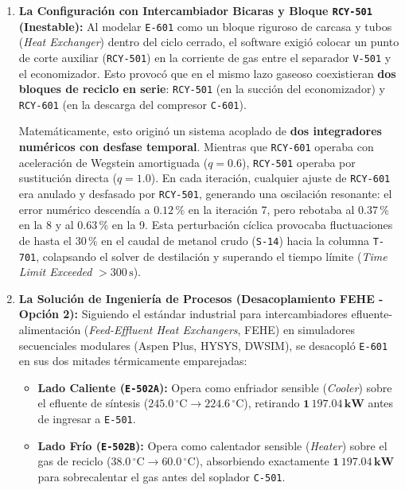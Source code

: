 \documentclass[11pt,a4paper]{article}
\begin{document}
\begin{enumerate}
    \item \textbf{La Configuración con Intercambiador Bicaras y Bloque \texttt{RCY-501} (Inestable):}  
    Al modelar \texttt{E-601} como un bloque riguroso de carcasa y tubos (\textit{Heat Exchanger}) dentro del ciclo cerrado, el software exigió colocar un punto de corte auxiliar (\texttt{RCY-501}) en la corriente de gas entre el separador \texttt{V-501} y el economizador. 
    Esto provocó que en el mismo lazo gaseoso coexistieran \textbf{dos bloques de reciclo en serie}: \texttt{RCY-501} (en la succión del economizador) y \texttt{RCY-601} (en la descarga del compresor \texttt{C-601}).
    
    Matemáticamente, esto originó un sistema acoplado de \textbf{dos integradores numéricos con desfase temporal}. Mientras que \texttt{RCY-601} operaba con aceleración de Wegstein amortiguada ($q = 0.6$), \texttt{RCY-501} operaba por sustitución directa ($q = 1.0$). En cada iteración, cualquier ajuste de \texttt{RCY-601} era anulado y desfasado por \texttt{RCY-501}, generando una oscilación resonante: el error numérico descendía a $0.12\,\%$ en la iteración 7, pero rebotaba al $0.37\,\%$ en la 8 y al $0.63\,\%$ en la 9. 
    Esta perturbación cíclica provocaba fluctuaciones de hasta el $30\,\%$ en el caudal de metanol crudo (\texttt{S-14}) hacia la columna \texttt{T-701}, colapsando el solver de destilación y superando el tiempo límite (\textit{Time Limit Exceeded} $>300\,\text{s}$).

    \item \textbf{La Solución de Ingeniería de Procesos (Desacoplamiento FEHE - Opción 2):}  
    Siguiendo el estándar industrial para intercambiadores efluente-alimentación (\textit{Feed-Effluent Heat Exchangers}, FEHE) en simuladores secuenciales modulares (Aspen Plus, HYSYS, DWSIM), se desacopló \texttt{E-601} en sus dos mitades térmicamente emparejadas:
    \begin{itemize}
        \item \textbf{Lado Caliente (\texttt{E-502A}):} Opera como enfriador sensible (\textit{Cooler}) sobre el efluente de síntesis ($245.0\,^\circ\text{C} \to 224.6\,^\circ\text{C}$), retirando $\mathbf{1\,197.04\,\text{kW}}$ antes de ingresar a \texttt{E-501}.
        \item \textbf{Lado Frío (\texttt{E-502B}):} Opera como calentador sensible (\textit{Heater}) sobre el gas de reciclo ($38.0\,^\circ\text{C} \to 60.0\,^\circ\text{C}$), absorbiendo exactamente $\mathbf{1\,197.04\,\text{kW}}$ para sobrecalentar el gas antes del soplador \texttt{C-501}.
    \end{itemize}
    

\end{enumerate}
\end{document}
